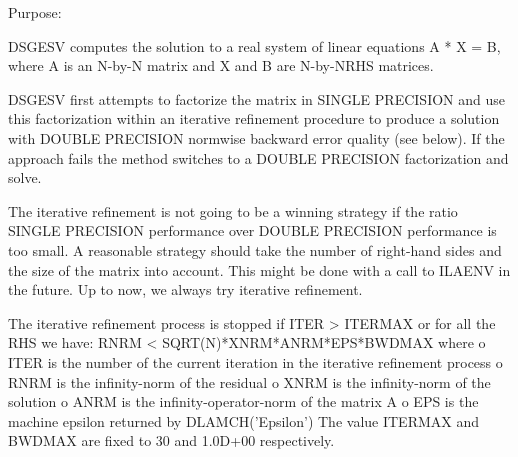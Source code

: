  \begin{DoxyParagraph}{Purpose\+: }
\begin{DoxyVerb} DSGESV computes the solution to a real system of linear equations
    A * X = B,
 where A is an N-by-N matrix and X and B are N-by-NRHS matrices.

 DSGESV first attempts to factorize the matrix in SINGLE PRECISION
 and use this factorization within an iterative refinement procedure
 to produce a solution with DOUBLE PRECISION normwise backward error
 quality (see below). If the approach fails the method switches to a
 DOUBLE PRECISION factorization and solve.

 The iterative refinement is not going to be a winning strategy if
 the ratio SINGLE PRECISION performance over DOUBLE PRECISION
 performance is too small. A reasonable strategy should take the
 number of right-hand sides and the size of the matrix into account.
 This might be done with a call to ILAENV in the future. Up to now, we
 always try iterative refinement.

 The iterative refinement process is stopped if
     ITER > ITERMAX
 or for all the RHS we have:
     RNRM < SQRT(N)*XNRM*ANRM*EPS*BWDMAX
 where
     o ITER is the number of the current iteration in the iterative
       refinement process
     o RNRM is the infinity-norm of the residual
     o XNRM is the infinity-norm of the solution
     o ANRM is the infinity-operator-norm of the matrix A
     o EPS is the machine epsilon returned by DLAMCH('Epsilon')
 The value ITERMAX and BWDMAX are fixed to 30 and 1.0D+00
 respectively.\end{DoxyVerb}
 
\end{DoxyParagraph}

